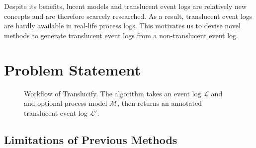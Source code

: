 
Despite its benefits, lucent models and translucent event logs are relatively new concepts and are therefore scarcely researched. As a result, translucent event logs are hardly available in real-life process logs. This motivates us to devise novel methods to generate translucent event logs from a non-translucent event log.

\section{Problem Statement}
\label{sec:intro_ssec:probs}

\begin{figure}
    \centering
    \caption{Workflow of Translucify. The algorithm takes an event log $\mathcal{L}$ and and optional process model $\mathcal{M}$, then returns an annotated translucent event log $\mathcal{L'}$.}
    \label{fig:enter-label}
\end{figure}

\subsection{Limitations of Previous Methods}

